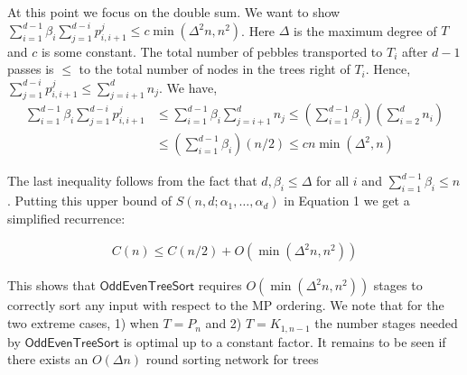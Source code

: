 \documentclass[runningheads,a4paper]{llncs}
\begin{document}
\noindent At this point we focus on the double sum. We want to show $\sum_{i=1}^{d-1}{\beta_i\sum_{j=1}^{d-i}{p^j_{i,i+1}}}  \le c\min(\Delta^2 n,n^2)$. Here $\Delta$ is the maximum degree of $T$ and $c$ is some constant.  The total number of pebbles transported to $T_i$ after $d-1$ passes is $\le$ to the total number of nodes in the trees right of $T_i$. Hence, $\sum_{j=1}^{d-i}{p^j_{i,i+1}} \le \sum_{j=i+1}^{d}{n_j}$. We have,
\begin{align}
\nonumber \sum_{i=1}^{d-1}{\beta_i\sum_{j=1}^{d-i}{p^j_{i,i+1}}}  &\le \sum_{i=1}^{d-1}{\beta_i\sum_{j=i+1}^{d}{n_j}} \le \left(\sum_{i=1}^{d-1}{\beta_i}\right)\left(\sum_{i=2}^{d}{n_i}\right) \\&\le \left(\sum_{i=1}^{d-1}{\beta_i}\right)(n/2) \le cn\min(\Delta^2,n)
\end{align}

\noindent The last inequality follows from the fact that $d, \beta_i \le \Delta$ for all $i$ and $\sum_{i=1}^{d-1}{\beta_i} \le n$.  Putting this upper bound of $S(n,d; \alpha_1,\ldots,\alpha_d) $ in Equation 1 we get a simplified recurrence:

\begin{align}
C(n) \le C(n/2) + O(\min(\Delta^2n,n^2))
\end{align}

\noindent  This shows that $\mathsf{OddEvenTreeSort}$ requires $O(\min{(\Delta^2n,n^2)})$ stages to correctly sort any input with respect to the MP ordering. We note that for the two extreme cases, 1) when $T=P_n$ and 2) $T = K_{1,n-1}$ the number stages needed by $\mathsf{OddEvenTreeSort}$ is optimal up to a constant factor. It remains to be seen if there exists an $O(\Delta n)$ round sorting network for trees
\end{document}
